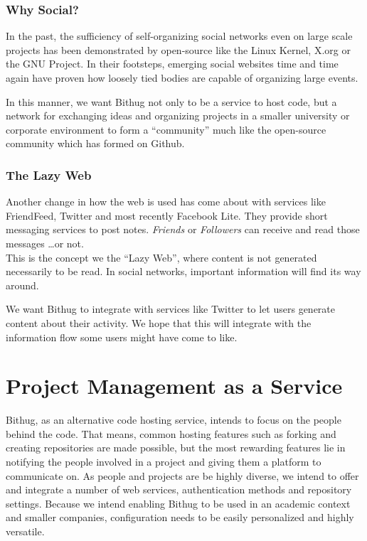 \documentclass{llncs}
\begin{document}
\subsubsection*{Why Social?}
In the past, the sufficiency of self-organizing social networks even on large 
scale projects has been demonstrated by open-source like the Linux 
Kernel\cite{kernel:www}, X.org\cite{xorg:www} or the GNU Project\cite{gnu:www}.
In their footsteps, emerging social websites time and time again have proven how 
loosely tied bodies are capable of organizing large 
events.\cite{facebook:help}\cite{twitter:organize}\cite{facebook:organize}

In this manner, we want Bithug not only to be a service to host code, but a 
network for exchanging ideas and organizing projects in a smaller university 
or corporate environment to form a ``community'' much like the open-source 
community which has formed on Github.
\subsubsection*{The Lazy Web}
Another change in how the web is used has come about with services like 
FriendFeed, Twitter and most recently Facebook Lite. They provide short 
messaging services to post notes. \emph{Friends} or \emph{Followers} can
receive and read those messages \ldots or not.\\
This is the concept we the ``Lazy Web'', where content is not generated 
necessarily to be read. In social networks, important information will find 
its way around.

We want Bithug to integrate with services like Twitter to let users generate 
content about their activity. We hope that this will integrate with the 
information flow some users might have come to like.

\section{Project Management as a Service}
Bithug, as an alternative code hosting service, intends to focus on the people 
behind the code. That means, common hosting features such as forking and creating 
repositories are made possible, but the most rewarding features lie in notifying 
the people involved in a project and giving them a platform to communicate on. As 
people and projects are be highly diverse, we intend to offer and integrate a 
number of web services, authentication methods and repository settings. Because 
we intend enabling Bithug to be used in an academic context and smaller companies, 
configuration needs to be easily personalized and highly versatile.
\end{document}
